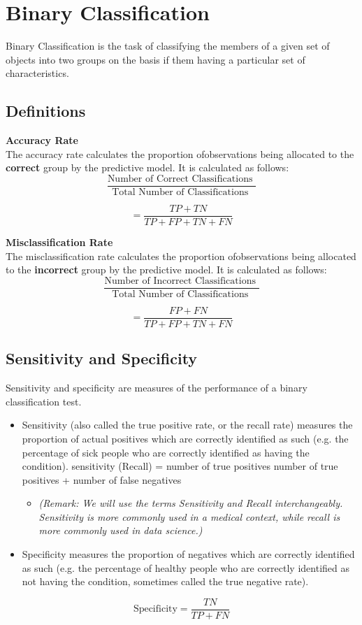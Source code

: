 \documentclass[a4paper,12pt]{article}
\begin{document}
	
	
	\section*{Binary Classification}
	
Binary Classification is the task of classifying the members of a given set of objects into two groups on the basis
if them having a particular set of characteristics.
	\subsection*{Definitions}
	\textbf{Accuracy Rate}\\
	The accuracy rate calculates the proportion ofobservations being allocated to the \textbf{correct} group by the predictive model. It is calculated as follows:
	\[ \frac{
		\mbox{Number of Correct Classifications }}{\mbox{Total Number of Classifications }} \]
	
	\[ = \frac{TP + TN}{TP+FP+TN+FN}\]
	
	
	\noindent \textbf{Misclassification Rate}\\
	The misclassification rate calculates the proportion ofobservations being allocated to the \textbf{incorrect} group by the predictive model. It is calculated as follows:
	\[ \frac{
		\mbox{Number of Incorrect Classifications }}{\mbox{Total Number of Classifications }} \]
	
	\[ = \frac{FP + FN}{TP+FP+TN+FN}\]



\subsection*{Sensitivity and Specificity}
Sensitivity and specificity are measures of the performance of a binary classification
test.
\begin{itemize}
	\item Sensitivity (also called the true positive rate, or the recall rate) measures
	the proportion of actual positives which are correctly identified
	as such (e.g. the percentage of sick people who are correctly identified
	as having the condition).
	sensitivity (Recall) = number of true positives
	number of true positives + number of false negatives
	\begin{itemize}
		\item \textit{(Remark: We will use the terms Sensitivity and Recall interchangeably.
			Sensitivity is more commonly used in a medical context, while recall is more
			commonly used in data science.)}
	\end{itemize}
	\item Specificity measures the proportion of negatives which are correctly
	identified as such (e.g. the percentage of healthy people who are correctly
	identified as not having the condition, sometimes called the true
	negative rate).
\end{itemize}
\[ \mbox{Specificity} = \frac{TN}{TP +FN}\]
\end{document}
